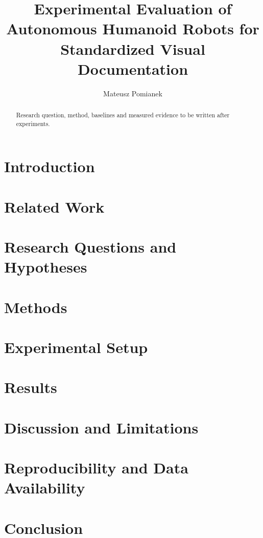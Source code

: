 \documentclass[11pt,a4paper]{article}
\title{Experimental Evaluation of Autonomous Humanoid Robots for Standardized Visual Documentation}
\author{Mateusz Pomianek}
\date{}
\begin{document}
\maketitle
\begin{abstract}
Research question, method, baselines and measured evidence to be written after experiments.
\end{abstract}
\section{Introduction}
\section{Related Work}
\section{Research Questions and Hypotheses}
\section{Methods}
\section{Experimental Setup}
\section{Results}
\section{Discussion and Limitations}
\section{Reproducibility and Data Availability}
\section{Conclusion}
\end{document}
